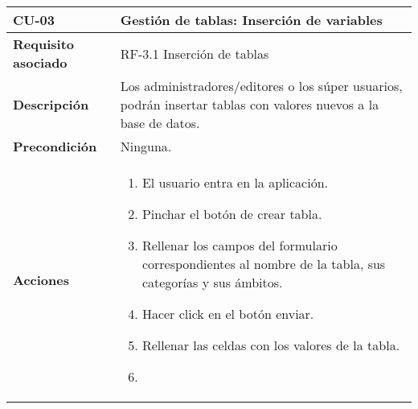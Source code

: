 \newpage
\begin{longtable}[H]{@{}ll@{}}
\toprule
\begin{minipage}[b]{0.23\columnwidth}\raggedright\strut
\textbf{CU-03}\strut
\end{minipage} & \begin{minipage}[b]{0.71\columnwidth}\raggedright\strut
\textbf{Gestión de tablas: Inserción de variables}\strut
\end{minipage}\tabularnewline
\midrule
\endhead
\begin{minipage}[t]{0.23\columnwidth}\raggedright\strut
\textbf{Requisito asociado}\strut
\end{minipage} & \begin{minipage}[t]{0.71\columnwidth}\raggedright\strut
RF-3.1 Inserción de tablas\strut
\end{minipage}\tabularnewline
\begin{minipage}[t]{0.23\columnwidth}\raggedright\strut
\textbf{Descripción}\strut
\end{minipage} & \begin{minipage}[t]{0.71\columnwidth}\raggedright\strut
Los administradores/editores o los súper usuarios, podrán insertar tablas con
valores nuevos a la base de datos.
\strut
\end{minipage}\tabularnewline
\begin{minipage}[t]{0.23\columnwidth}\raggedright\strut
\textbf{Precondición}\strut
\end{minipage} & \begin{minipage}[t]{0.71\columnwidth}\raggedright\strut
Ninguna.\strut
\end{minipage}\tabularnewline
\begin{minipage}[t]{0.23\columnwidth}\raggedright\strut
\textbf{Acciones}\strut
\end{minipage} & \begin{minipage}[t]{0.71\columnwidth}\raggedright\strut
\begin{enumerate}
\def\labelenumi{\arabic{enumi}.}
\tightlist
\item
  El usuario entra en la aplicación.
\item
  Pinchar el botón de crear tabla.
\item
Rellenar los campos del formulario correspondientes al nombre de la tabla, sus categorías y sus ámbitos.
\item
Hacer click en el botón enviar.
\item 
Rellenar las celdas con los valores de la tabla.
\item

\end{enumerate}
\end{minipage}
\end{longtable}
